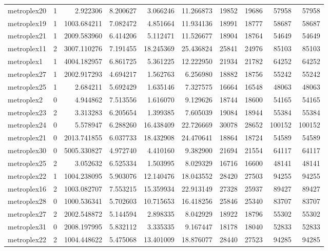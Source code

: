 \begin{longtable}{|l|r|r|r|r|r|r|r|r|r|}
metroplex20 & 1 & 2.922306 & 8.200627 & 3.066246 & 11.266873 & 19852 & 19686 & 57958 & 57958 \\
metroplex19 & 1 & 1003.684211 & 7.082472 & 4.851664 & 11.934136 & 18991 & 18777 & 58687 & 58687 \\
metroplex21 & 1 & 2009.583960 & 6.414206 & 5.112471 & 11.526677 & 18904 & 18764 & 54649 & 54649 \\
metroplex11 & 2 & 3007.110276 & 7.191455 & 18.245369 & 25.436824 & 25841 & 24976 & 85103 & 85103 \\
metroplex1 & 1 & 4004.182957 & 6.861725 & 5.361225 & 12.222950 & 21934 & 21782 & 64252 & 64252 \\
metroplex27 & 1 & 2002.917293 & 4.694217 & 1.562763 & 6.256980 & 18882 & 18756 & 55242 & 55242 \\
metroplex25 & 1 & 2.684211 & 5.692429 & 1.635146 & 7.327575 & 16664 & 16548 & 48063 & 48063 \\
metroplex2 & 0 & 4.944862 & 7.513556 & 1.616070 & 9.129626 & 18744 & 18600 & 54165 & 54165 \\
metroplex23 & 2 & 3.313283 & 6.205654 & 1.399385 & 7.605039 & 19084 & 18944 & 55384 & 55384 \\
metroplex24 & 0 & 5.578947 & 6.288260 & 16.438409 & 22.726669 & 30078 & 28652 & 100152 & 100152 \\
metroplex21 & 0 & 2013.741855 & 6.037733 & 18.432908 & 24.470641 & 18864 & 18724 & 54589 & 54589 \\
metroplex30 & 0 & 5005.330827 & 4.972740 & 4.410160 & 9.382900 & 21694 & 21554 & 64117 & 64117 \\
metroplex25 & 2 & 3.052632 & 6.525334 & 1.503995 & 8.029329 & 16716 & 16600 & 48141 & 48141 \\
metroplex22 & 1 & 1004.238095 & 5.903076 & 12.140476 & 18.043552 & 28420 & 27503 & 94255 & 94255 \\
metroplex16 & 2 & 1003.082707 & 7.553215 & 15.359934 & 22.913149 & 27328 & 25937 & 89427 & 89427 \\
metroplex28 & 0 & 1000.536341 & 5.702603 & 10.715653 & 16.418256 & 25846 & 25340 & 83707 & 83707 \\
metroplex27 & 2 & 2002.548872 & 5.144594 & 2.898335 & 8.042929 & 18922 & 18796 & 55302 & 55302 \\
metroplex31 & 0 & 2008.197995 & 5.832112 & 3.335335 & 9.167447 & 18178 & 18040 & 52833 & 52833 \\
metroplex22 & 2 & 1004.448622 & 5.475068 & 13.401009 & 18.876077 & 28440 & 27523 & 94285 & 94285 \\

\end{longtable}
